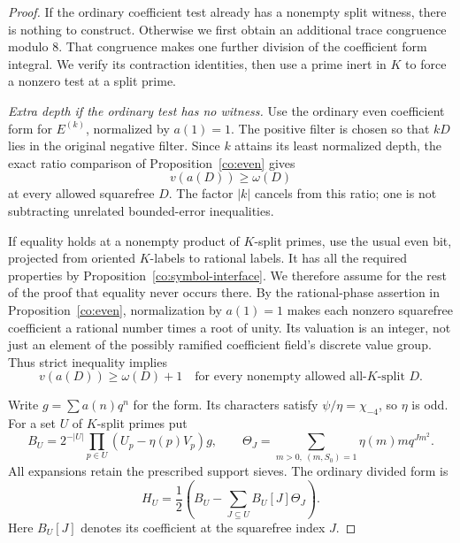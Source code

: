 \begin{proof}
If the ordinary coefficient test already has a nonempty split witness,
there is nothing to construct.  Otherwise we first obtain an additional
trace congruence modulo $8$.  That congruence makes one further division
of the coefficient form integral.  We verify its contraction identities,
then use a prime inert in $K$ to force a nonzero test at a split prime.

\emph{Extra depth if the ordinary test has no witness.}
Use the ordinary even coefficient form for $E^{(k)}$, normalized by
$a(1)=1$.  The positive filter is chosen so that $kD$ lies in the original
negative filter.  Since $k$ attains its least normalized depth, the exact
ratio comparison of Proposition~\ref{co:even} gives
\begin{equation}\label{pw:split-basic-depth}
 v(a(D))\ge\omega(D)
\end{equation}
at every allowed squarefree $D$.  The factor $|k|$ cancels from this ratio;
one is not subtracting unrelated bounded-error inequalities.

If equality holds at a nonempty product of $K$-split primes, use the usual
even bit, projected from oriented $K$-labels to rational labels.  It has
all the required properties by Proposition~\ref{co:symbol-interface}.  We
therefore assume for the rest of the proof that equality never occurs
there.  By the rational-phase assertion in Proposition~\ref{co:even},
normalization by $a(1)=1$ makes each nonzero squarefree coefficient a
rational number times a root of unity.  Its valuation is an integer,
not just an element of the possibly ramified coefficient field's
discrete value group.  Thus strict inequality implies
\begin{equation}\label{pw:split-extra-depth}
 v(a(D))\ge\omega(D)+1
 \quad\text{for every nonempty allowed all-$K$-split }D.
\end{equation}

Write $g=\sum a(n)q^n$ for the form.  Its characters satisfy
$\psi/\eta=\chi_{-4}$, so $\eta$ is odd.  For a set $U$ of $K$-split
primes put
\[
 B_U=2^{-|U|}\prod_{p\in U}(U_p-\eta(p)V_p)g,
 \qquad
 \Theta_J=\sum_{m>0,\ (m,S_0)=1}\eta(m)m q^{Jm^2}.
\]
All expansions retain the prescribed support sieves.  The ordinary divided
form is
\[
 H_U=\frac12\left(B_U-\sum_{J\subseteq U}B_U[J]\Theta_J\right).
\]
Here $B_U[J]$ denotes its coefficient at the squarefree index $J$.


\end{proof}
